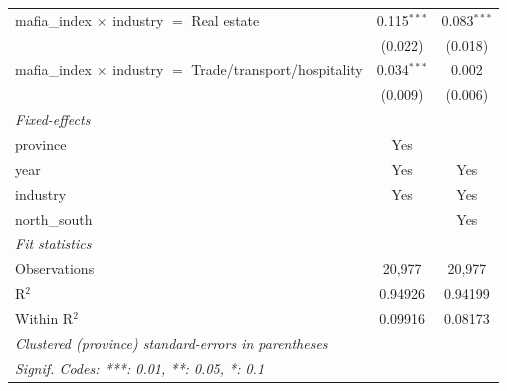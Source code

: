 \begin{tabular}{lcc}
   mafia\_index $\times$ industry $=$ Real estate                   & 0.115$^{***}$ & 0.083$^{***}$\\   
                                                                    & (0.022)       & (0.018)\\   
   mafia\_index $\times$ industry $=$ Trade/transport/hospitality   & 0.034$^{***}$ & 0.002\\   
                                                                    & (0.009)       & (0.006)\\   
   \midrule
   \emph{Fixed-effects}\\
   province                                                         & Yes           & \\  
   year                                                             & Yes           & Yes\\  
   industry                                                         & Yes           & Yes\\  
   north\_south                                                     &               & Yes\\  
   \midrule
   \emph{Fit statistics}\\
   Observations                                                     & 20,977        & 20,977\\  
   R$^2$                                                            & 0.94926       & 0.94199\\  
   Within R$^2$                                                     & 0.09916       & 0.08173\\  
   \midrule \midrule
   \multicolumn{3}{l}{\emph{Clustered (province) standard-errors in parentheses}}\\
   \multicolumn{3}{l}{\emph{Signif. Codes: ***: 0.01, **: 0.05, *: 0.1}}\\
\end{tabular}
\par\endgroup


